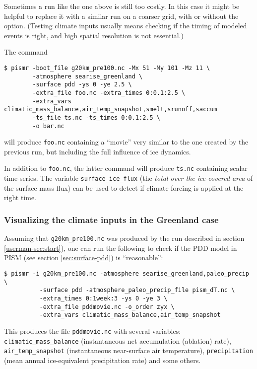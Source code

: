 \documentclass[titlepage,letterpaper,final]{scrartcl}
\begin{document}
Sometimes a run like the one above is still too costly. In this case it might be helpful to replace it with a similar run on a coarser grid, with or without the  option. (Testing climate inputs usually means checking if the timing of modeled events is right, and high spatial resolution is not essential.)

The command
\begin{verbatim}
$ pismr -boot_file g20km_pre100.nc -Mx 51 -My 101 -Mz 11 \
        -atmosphere searise_greenland \
        -surface pdd -ys 0 -ye 2.5 \
        -extra_file foo.nc -extra_times 0:0.1:2.5 \
        -extra_vars climatic_mass_balance,air_temp_snapshot,smelt,srunoff,saccum
        -ts_file ts.nc -ts_times 0:0.1:2.5 \
        -o bar.nc
\end{verbatim}
will produce \texttt{foo.nc} containing a ``movie'' very similar to the one created by the previous run, but including the full influence of ice dynamics.

In addition to \texttt{foo.nc}, the latter command will produce \texttt{ts.nc} containing scalar time-series. The variable \texttt{surface_ice_flux} (the \emph{total over the ice-covered area} of the surface mass flux) can be used to detect if climate forcing is applied at the right time.

\subsubsection{Visualizing the climate inputs in the Greenland case}
\label{sec:pdd-series}

Assuming that \texttt{g20km_pre100.nc} was produced by the run described in section
\ref{userman-sec:start}), one can run the following to check if the PDD
model in PISM (see section \ref{sec:surface-pdd}) is ``reasonable'':
\begin{verbatim}
$ pismr -i g20km_pre100.nc -atmosphere searise_greenland,paleo_precip \
          -surface pdd -atmosphere_paleo_precip_file pism_dT.nc \
          -extra_times 0:1week:3 -ys 0 -ye 3 \
          -extra_file pddmovie.nc -o_order zyx \
          -extra_vars climatic_mass_balance,air_temp_snapshot
\end{verbatim}
This produces the file \texttt{pddmovie.nc} with several variables: \texttt{climatic_mass_balance}
(instantaneous net accumulation (ablation) rate), \texttt{air_temp_snapshot}
(instantaneous near-surface air temperature), \texttt{precipitation} (mean annual
ice-equivalent precipitation rate) and some others.
\end{document}
